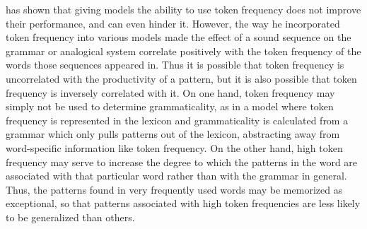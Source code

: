 

\citet{Albright_gradient_2006,Albright_modeling_2009} has shown that giving
models the ability to use token frequency does not improve their performance,
and can even hinder it. However, the way he incorporated token frequency into
various models made the effect of a sound sequence on the grammar or analogical
system correlate positively with the token frequency of the words those
sequences appeared in.  Thus it is possible that token frequency is
uncorrelated with the productivity of a pattern, but it is also possible that
token frequency is inversely correlated with it.  On one hand, token frequency
may simply not be used to determine grammaticality, as in a model where token
frequency is represented in the lexicon and grammaticality is calculated from a
grammar which only pulls patterns out of the lexicon, abstracting away from
word-specific information like token frequency.  On the other hand, high token
frequency may serve to increase the degree to which the patterns in the word
are associated with that particular word rather than with the grammar in
general. Thus, the patterns found in very frequently used words may be
memorized as exceptional, so that patterns associated with high token
frequencies are less likely to be generalized than others.

